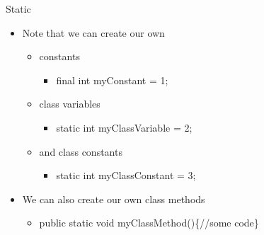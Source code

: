 \documentclass{beamer}
\begin{document}
\begin{frame}

Static 

\begin{itemize}
\item Note that we can create our own

\begin{itemize}
\item constants

\begin{itemize}
\item final int myConstant = 1;
\end{itemize}
\item class variables

\begin{itemize}
\item static int myClassVariable = 2;
\end{itemize}
\item and class constants

\begin{itemize}
\item static int myClassConstant = 3;
\end{itemize}
\end{itemize}
\item We can also create our own class methods

\begin{itemize}
\item public static void myClassMethod()\{//some code\} 
\end{itemize}
\end{itemize}

\end{frame} 
\end{document}
